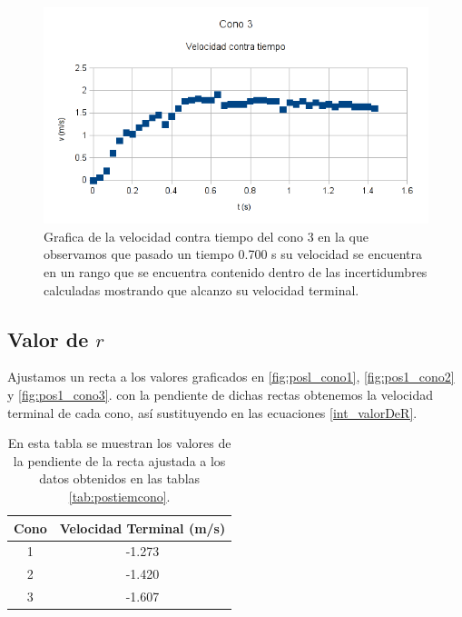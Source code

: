 \begin{figure}[h!]
    \centering
    \includegraphics{vel_cono3}
    \caption{Grafica de la velocidad contra tiempo del cono 3 en la que observamos que 
    pasado un tiempo 0.700 s su velocidad se encuentra en un rango que se encuentra contenido
    dentro de las incertidumbres calculadas mostrando que alcanzo su velocidad terminal.}
    \label{fig:VelCono3}
\end{figure}
\subsection{Valor de $r$}

Ajustamos un recta a los valores graficados en
\ref{fig:posl_cono1}, \ref{fig:pos1_cono2} y \ref{fig:pos1_cono3}.
con la pendiente de dichas rectas obtenemos la velocidad
terminal de cada cono, así sustituyendo en las ecuaciones
\ref{int_valorDeR}.

\begin{table}
    \centering
    \begin{tabular}{|c|c|}
        \hline
        \rowcolor{azulito} Cono & Velocidad Terminal (m/s) \\
        \hline 1 & -1.273 \\
        \hline 2 & -1.420 \\
        \hline 3 & -1.607 \\
        \hline
    \end{tabular}
    \caption{En esta tabla se muestran los valores
    de la pendiente de la recta ajustada a los datos
    obtenidos en las tablas \ref{tab:postiemcono}.}
    \label{tab:VelTerminal}
\end{table}

